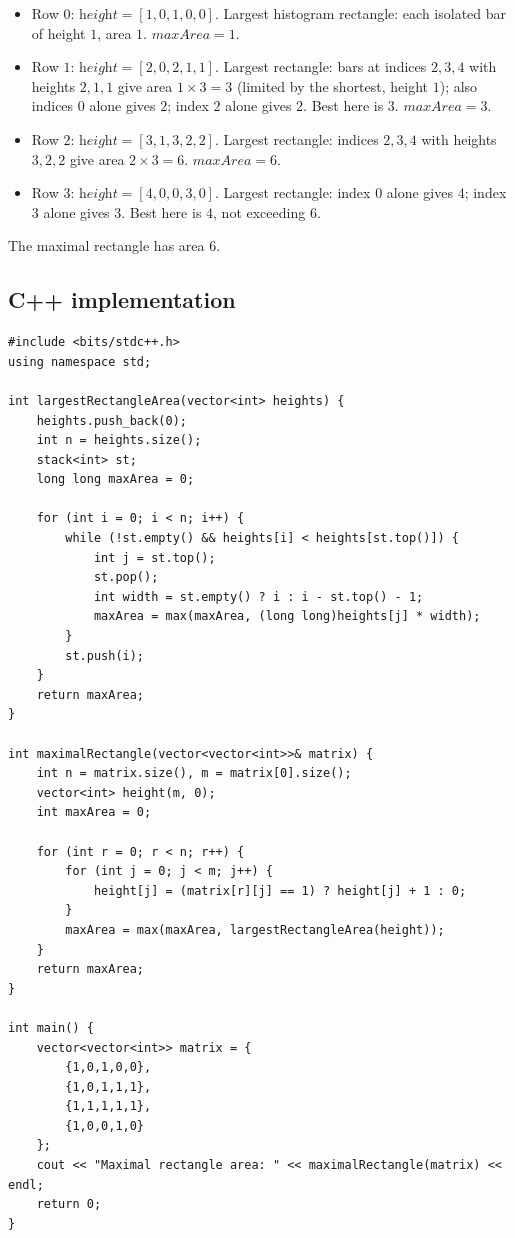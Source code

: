 \begin{itemize}
  \item Row $0$: $\textit{height}=[1,0,1,0,0]$. Largest histogram
        rectangle: each isolated bar of height $1$, area $1$.
        $\textit{maxArea}=1$.
  \item Row $1$: $\textit{height}=[2,0,2,1,1]$. Largest rectangle: bars
        at indices $2,3,4$ with heights $2,1,1$ give area
        $1\times3=3$ (limited by the shortest, height $1$); also
        indices $0$ alone gives $2$; index $2$ alone gives $2$.
        Best here is $3$. $\textit{maxArea}=3$.
  \item Row $2$: $\textit{height}=[3,1,3,2,2]$. Largest rectangle:
        indices $2,3,4$ with heights $3,2,2$ give area $2\times3=6$.
        $\textit{maxArea}=6$.
  \item Row $3$: $\textit{height}=[4,0,0,3,0]$. Largest rectangle:
        index $0$ alone gives $4$; index $3$ alone gives $3$. Best here
        is $4$, not exceeding $6$.
\end{itemize}

The maximal rectangle has area $\boxed{6}$.

\subsection*{C++ implementation}

\begin{lstlisting}
#include <bits/stdc++.h>
using namespace std;

int largestRectangleArea(vector<int> heights) {
    heights.push_back(0);
    int n = heights.size();
    stack<int> st;
    long long maxArea = 0;

    for (int i = 0; i < n; i++) {
        while (!st.empty() && heights[i] < heights[st.top()]) {
            int j = st.top();
            st.pop();
            int width = st.empty() ? i : i - st.top() - 1;
            maxArea = max(maxArea, (long long)heights[j] * width);
        }
        st.push(i);
    }
    return maxArea;
}

int maximalRectangle(vector<vector<int>>& matrix) {
    int n = matrix.size(), m = matrix[0].size();
    vector<int> height(m, 0);
    int maxArea = 0;

    for (int r = 0; r < n; r++) {
        for (int j = 0; j < m; j++) {
            height[j] = (matrix[r][j] == 1) ? height[j] + 1 : 0;
        }
        maxArea = max(maxArea, largestRectangleArea(height));
    }
    return maxArea;
}

int main() {
    vector<vector<int>> matrix = {
        {1,0,1,0,0},
        {1,0,1,1,1},
        {1,1,1,1,1},
        {1,0,0,1,0}
    };
    cout << "Maximal rectangle area: " << maximalRectangle(matrix) << endl;
    return 0;
}
\end{lstlisting}

